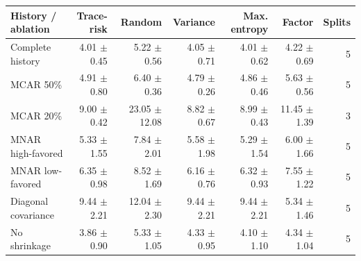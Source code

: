 \begin{tabular}{lrrrrrr}
\toprule
History / ablation & Trace-risk & Random & Variance & Max. entropy & Factor & Splits \\
\midrule
Complete history & 4.01 $\pm$ 0.45 & 5.22 $\pm$ 0.56 & 4.05 $\pm$ 0.71 & 4.01 $\pm$ 0.62 & 4.22 $\pm$ 0.69 & 5 \\
MCAR 50\% & 4.91 $\pm$ 0.80 & 6.40 $\pm$ 0.36 & 4.79 $\pm$ 0.26 & 4.86 $\pm$ 0.46 & 5.63 $\pm$ 0.56 & 5 \\
MCAR 20\% & 9.00 $\pm$ 0.42 & 23.05 $\pm$ 12.08 & 8.82 $\pm$ 0.67 & 8.99 $\pm$ 0.43 & 11.45 $\pm$ 1.39 & 3 \\
MNAR high-favored & 5.33 $\pm$ 1.55 & 7.84 $\pm$ 2.01 & 5.58 $\pm$ 1.98 & 5.29 $\pm$ 1.54 & 6.00 $\pm$ 1.66 & 5 \\
MNAR low-favored & 6.35 $\pm$ 0.98 & 8.52 $\pm$ 1.69 & 6.16 $\pm$ 0.76 & 6.32 $\pm$ 0.93 & 7.55 $\pm$ 1.22 & 5 \\
Diagonal covariance & 9.44 $\pm$ 2.21 & 12.04 $\pm$ 2.30 & 9.44 $\pm$ 2.21 & 9.44 $\pm$ 2.21 & 5.34 $\pm$ 1.46 & 5 \\
No shrinkage & 3.86 $\pm$ 0.90 & 5.33 $\pm$ 1.05 & 4.33 $\pm$ 0.95 & 4.10 $\pm$ 1.10 & 4.34 $\pm$ 1.04 & 5 \\
\bottomrule
\end{tabular}
